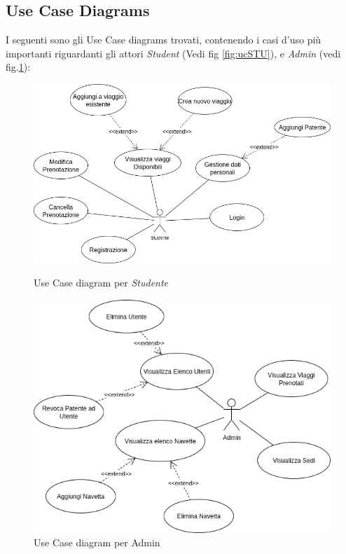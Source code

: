 \subsection{Use Case Diagrams}
I seguenti sono gli Use Case diagrams trovati, contenendo i casi d'uso più importanti riguardanti gli attori \textit{Student} (Vedi fig \ref{fig:ucSTU}), e \textit{Admin} (vedi fig.\ref{fig:ucADM}):
\begin{figure}[H]
    \centering
    \includegraphics[width=1\linewidth]{Images/Student UC.png}
    \caption{Use Case diagram per \textit{Studente}}
    \label{fig:ucSTU}

    \vspace{0.5cm}

    \centering
    \includegraphics[width=1\linewidth]{Images/Admin UC.png}
    \caption{Use Case diagram per Admin}
    \label{fig:ucADM}
\end{figure}
